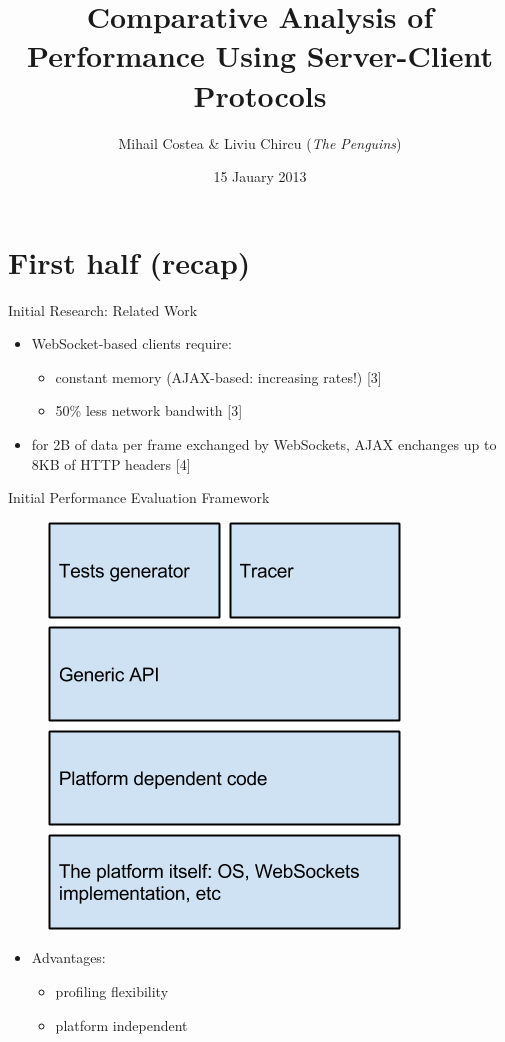 \documentclass{soa.cs.pub.ro}
\title[Performance Evaluation Framework]{Comparative Analysis of Performance Using
Server-Client Protocols}
\subtitle{Mihail Costea \& Liviu Chircu (\textit{The Penguins})}
\date{15 Jauary 2013}
\begin{document}
\frame{\titlepage}

\frame{\tableofcontents}

\section{First half (recap)}

\begin{frame}{Initial Research: Related Work}
  \begin{itemize}
    \item WebSocket-based clients require:
      \begin{itemize}
        \item constant memory (AJAX-based: increasing rates!) [3]
        \item 50\% less network bandwith [3]
      \end{itemize}
    \item for 2B of data per frame exchanged by WebSockets, AJAX enchanges
      up to 8KB of HTTP headers [4]
  \end{itemize}
\end{frame}

\begin{frame}{Initial Performance Evaluation Framework}
  \begin{figure}
     \includegraphics[scale=0.32]{img/architecture.png}
  \end{figure}
  \begin{itemize}
    \item Advantages:
      \begin{itemize}
        \item profiling flexibility
        \item platform independent
      \end{itemize}
  \end{itemize}
\end{frame}
\end{document}
